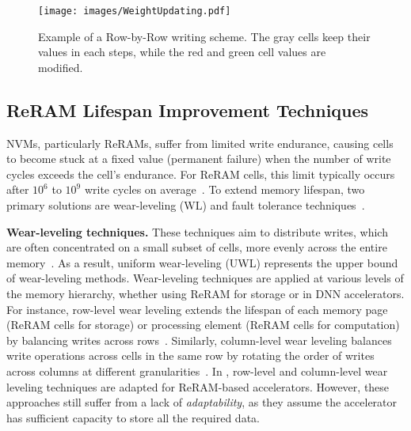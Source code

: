 \begin{figure}[t!]
    \centering
    \texttt{[image: images/WeightUpdating.pdf]}
    \vskip -0.10in
    \caption{Example of a Row-by-Row writing scheme. The gray cells keep their values in each steps, while the red and green cell values are modified.}
    \label{fig:WeightUpdating}
    \vskip -0.15in
\end{figure}

\subsection{ReRAM Lifespan Improvement Techniques}\label{subs:Lifespan improvements}
NVMs, particularly ReRAMs, suffer from limited write endurance, causing cells to become stuck at a fixed value (permanent failure) when the number of write cycles exceeds the cell's endurance. For ReRAM cells, this limit typically occurs after $10^6$ to $10^9$ write cycles on average~\cite{Weebit, crossbar, Realizing}. To extend memory lifespan, two primary solutions are wear-leveling (WL) and fault tolerance techniques~\cite{FLOWER_and_FaME, WoLFRaM}.

\textbf{Wear-leveling techniques.} These techniques aim to distribute writes, which are often concentrated on a small subset of cells, more evenly across the entire memory~\cite{WoLFRaM,Realizing,ARS}. As a result, uniform wear-leveling (UWL) represents the upper bound of wear-leveling methods. Wear-leveling techniques are applied at various levels of the memory hierarchy, whether using ReRAM for storage or in DNN accelerators. For instance, row-level wear leveling extends the lifespan of each memory page (ReRAM cells for storage) or processing element (ReRAM cells for computation) by balancing writes across rows~\cite{ARS, SAWL,Bloom_filter}. Similarly, column-level wear leveling balances write operations across cells in the same row by rotating the order of writes across columns at different granularities~\cite{WELCOMF,ILF}. In \cite{ReNEW,On_Endurance}, row-level and column-level wear leveling techniques are adapted for ReRAM-based accelerators. However, these approaches still suffer from a lack of \textit{adaptability}, as they assume the accelerator has sufficient capacity to store all the required data.


